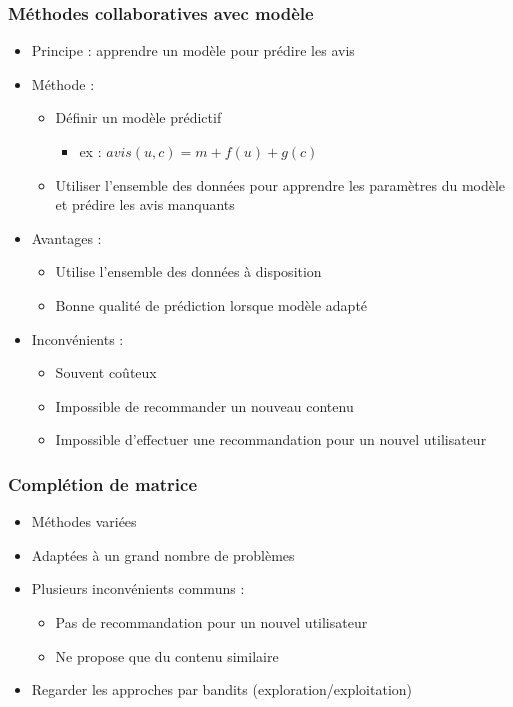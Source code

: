 \documentclass[c]{beamer}
\begin{document}
\begin{frame}
    \frametitle{M\'ethodes collaboratives avec modèle}

    \begin{itemize}
        \item Principe : apprendre un modèle pour pr\'edire les avis
        \item<2-> M\'ethode :
            \begin{itemize}
                \item D\'efinir un modèle pr\'edictif
                    \begin{itemize}
                        \item ex : $avis(u,c) = m + f(u) + g(c)$
                    \end{itemize}
                \item Utiliser l'ensemble des donn\'ees pour apprendre
                    les paramètres du modèle et pr\'edire les avis manquants
            \end{itemize}
        \item<3-> Avantages :
            \begin{itemize}
                \item Utilise l'ensemble des donn\'ees à disposition
                \item Bonne qualit\'e de pr\'ediction lorsque modèle adapt\'e
            \end{itemize}
        \item<4-> Inconv\'enients :
            \begin{itemize}
                \item Souvent coûteux
                \item Impossible de recommander un nouveau contenu
                \item Impossible d'effectuer une recommandation pour un
                    nouvel utilisateur
            \end{itemize}
    \end{itemize}
\end{frame}

\begin{frame}
    \frametitle{Compl\'etion de matrice}

    \begin{itemize}
        \item M\'ethodes vari\'ees
        \item Adapt\'ees à un grand nombre de problèmes
        \item Plusieurs inconv\'enients communs :
            \begin{itemize}
                \item Pas de recommandation pour un nouvel utilisateur
                \item Ne propose que du contenu similaire
            \end{itemize}
        \item Regarder les approches par bandits (exploration/exploitation)
    \end{itemize}
\end{frame}
\end{document}

